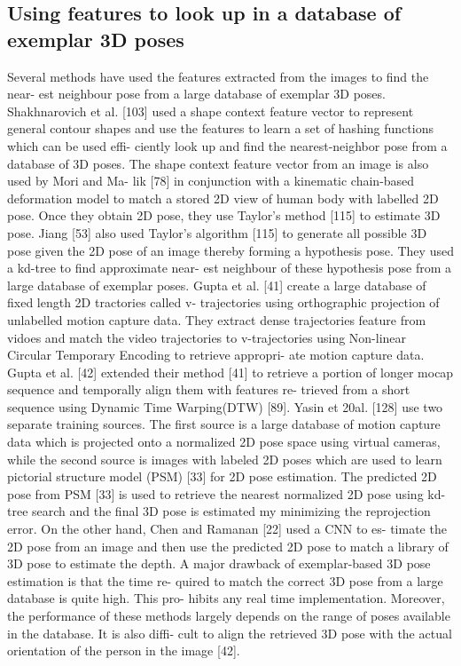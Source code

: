 \subsection{Using features to look up in a database of exemplar 3D poses}

Several methods have used the features extracted from the images to find the near-
est neighbour pose from a large database of exemplar 3D poses. Shakhnarovich et
al. [103] used a shape context feature vector to represent general contour shapes
and use the features to learn a set of hashing functions which can be used effi-
ciently look up and find the nearest-neighbor pose from a database of 3D poses.
The shape context feature vector from an image is also used by Mori and Ma-
lik [78] in conjunction with a kinematic chain-based deformation model to match
a stored 2D view of human body with labelled 2D pose. Once they obtain 2D pose,
they use Taylor’s method [115] to estimate 3D pose. Jiang [53] also used Taylor’s
algorithm [115] to generate all possible 3D pose given the 2D pose of an image
thereby forming a hypothesis pose. They used a kd-tree to find approximate near-
est neighbour of these hypothesis pose from a large database of exemplar poses.
Gupta et al. [41] create a large database of fixed length 2D tractories called v-
trajectories using orthographic projection of unlabelled motion capture data. They
extract dense trajectories feature from vidoes and match the video trajectories to
v-trajectories using Non-linear Circular Temporary Encoding to retrieve appropri-
ate motion capture data. Gupta et al. [42] extended their method [41] to retrieve
a portion of longer mocap sequence and temporally align them with features re-
trieved from a short sequence using Dynamic Time Warping(DTW) [89]. Yasin et
20al. [128] use two separate training sources. The first source is a large database
of motion capture data which is projected onto a normalized 2D pose space using
virtual cameras, while the second source is images with labeled 2D poses which
are used to learn pictorial structure model (PSM) [33] for 2D pose estimation. The
predicted 2D pose from PSM [33] is used to retrieve the nearest normalized 2D
pose using kd-tree search and the final 3D pose is estimated my minimizing the
reprojection error. On the other hand, Chen and Ramanan [22] used a CNN to es-
timate the 2D pose from an image and then use the predicted 2D pose to match a
library of 3D pose to estimate the depth.
A major drawback of exemplar-based 3D pose estimation is that the time re-
quired to match the correct 3D pose from a large database is quite high. This pro-
hibits any real time implementation. Moreover, the performance of these methods
largely depends on the range of poses available in the database. It is also diffi-
cult to align the retrieved 3D pose with the actual orientation of the person in the
image [42].

